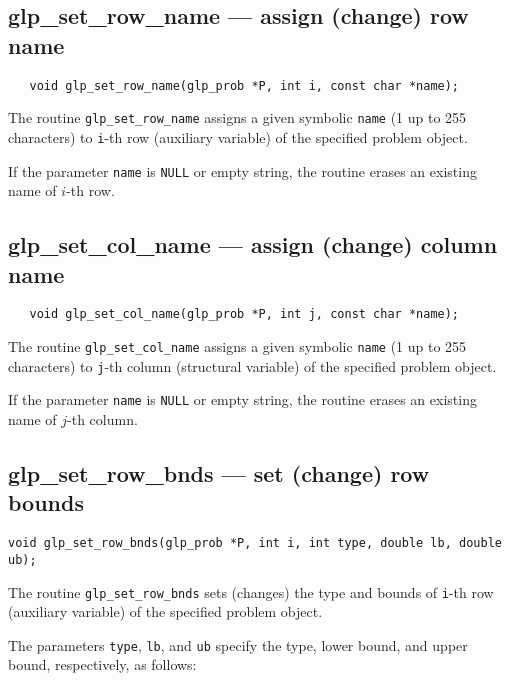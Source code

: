 \subsection{glp\_set\_row\_name --- assign (change) row name}

\synopsis

\begin{verbatim}
   void glp_set_row_name(glp_prob *P, int i, const char *name);
\end{verbatim}

\description

The routine \verb|glp_set_row_name| assigns a given symbolic
\verb|name| (1 up to 255 characters) to \verb|i|-th row (auxiliary
variable) of the specified problem object.

If the parameter \verb|name| is \verb|NULL| or empty string, the
routine erases an existing name of $i$-th row.

\subsection{glp\_set\_col\_name --- assign (change) column name}

\synopsis

\begin{verbatim}
   void glp_set_col_name(glp_prob *P, int j, const char *name);
\end{verbatim}

\description

The routine \verb|glp_set_col_name| assigns a given symbolic
\verb|name| (1 up to 255 characters) to \verb|j|-th column (structural
variable) of the specified problem object.

If the parameter \verb|name| is \verb|NULL| or empty string, the
routine erases an existing name of $j$-th column.

\subsection{glp\_set\_row\_bnds --- set (change) row bounds}

\synopsis

{\tt void glp\_set\_row\_bnds(glp\_prob *P, int i, int type,
double lb, double ub);}

\description

The routine \verb|glp_set_row_bnds| sets (changes) the type and bounds
of \verb|i|-th row (auxiliary variable) of the specified problem
object.

The parameters \verb|type|, \verb|lb|, and \verb|ub| specify the type,
lower bound, and upper bound, respectively, as follows:

